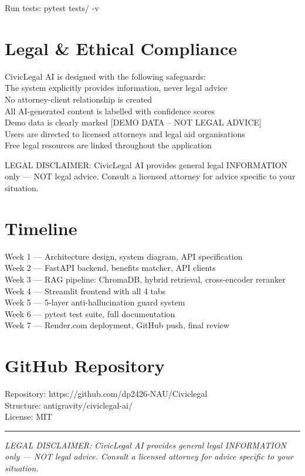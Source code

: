 \documentclass[12pt,a4paper]{article}
\begin{document}
Run tests: pytest tests/ -v

\section{Legal \& Ethical Compliance}
CivicLegal AI is designed with the following safeguards:\\\textbullet{}  The system explicitly provides information, never legal advice\\\textbullet{}  No attorney-client relationship is created\\\textbullet{}  All AI-generated content is labelled with confidence scores\\\textbullet{}  Demo data is clearly marked [DEMO DATA – NOT LEGAL ADVICE]\\\textbullet{}  Users are directed to licensed attorneys and legal aid organisations\\\textbullet{}  Free legal resources are linked throughout the application

LEGAL DISCLAIMER: CivicLegal AI provides general legal INFORMATION only — NOT legal advice. Consult a licensed attorney for advice specific to your situation.

\section{Timeline}
Week 1 — Architecture design, system diagram, API specification\\Week 2 — FastAPI backend, benefits matcher, API clients\\Week 3 — RAG pipeline: ChromaDB, hybrid retrieval, cross-encoder reranker\\Week 4 — Streamlit frontend with all 4 tabs\\Week 5 — 5-layer anti-hallucination guard system\\Week 6 — pytest test suite, full documentation\\Week 7 — Render.com deployment, GitHub push, final review

\section{GitHub Repository}
Repository: https://github.com/dp2426-NAU/Civiclegal\\Structure:   antigravity/civiclegal-ai/\\License:     MIT

\vspace{2em}
\hrule
\vspace{0.5em}
{\small\textit{LEGAL DISCLAIMER: CivicLegal AI provides general legal INFORMATION only — NOT legal advice. Consult a licensed attorney for advice specific to your situation.}}
\end{document}

